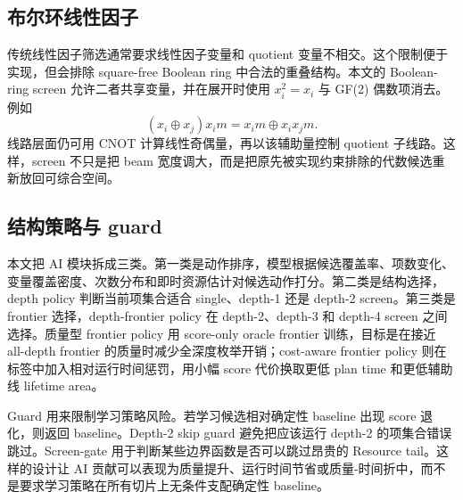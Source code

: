 \documentclass[UTF8,fontset=macnew,11pt]{ctexart}
\newcommand{\xor}{\ensuremath{\oplus}}
\begin{document}
\subsection{布尔环线性因子}

传统线性因子筛选通常要求线性因子变量和 quotient 变量不相交。这个限制便于实现，但会排除 square-free Boolean ring 中合法的重叠结构。本文的 Boolean-ring screen 允许二者共享变量，并在展开时使用 $x_i^2=x_i$ 与 GF(2) 偶数项消去。例如
\begin{equation}
  (x_i\xor x_j)x_i m = x_i m \xor x_i x_j m .
  \label{eq:boolean-ring}
\end{equation}
线路层面仍可用 CNOT 计算线性奇偶量，再以该辅助量控制 quotient 子线路。这样，screen 不只是把 beam 宽度调大，而是把原先被实现约束排除的代数候选重新放回可综合空间。

\subsection{结构策略与 guard}

本文把 AI 模块拆成三类。第一类是动作排序，模型根据候选覆盖率、项数变化、变量覆盖密度、次数分布和即时资源估计对候选动作打分。第二类是结构选择，depth policy 判断当前项集合适合 single、depth-1 还是 depth-2 screen。第三类是 frontier 选择，depth-frontier policy 在 depth-2、depth-3 和 depth-4 screen 之间选择。质量型 frontier policy 用 score-only oracle frontier 训练，目标是在接近 all-depth frontier 的质量时减少全深度枚举开销；cost-aware frontier policy 则在标签中加入相对运行时间惩罚，用小幅 score 代价换取更低 plan time 和更低辅助线 lifetime area。

Guard 用来限制学习策略风险。若学习候选相对确定性 baseline 出现 score 退化，则返回 baseline。Depth-2 skip guard 避免把应该运行 depth-2 的项集合错误跳过。Screen-gate 用于判断某些边界函数是否可以跳过昂贵的 Resource tail。这样的设计让 AI 贡献可以表现为质量提升、运行时间节省或质量-时间折中，而不是要求学习策略在所有切片上无条件支配确定性 baseline。
\end{document}
